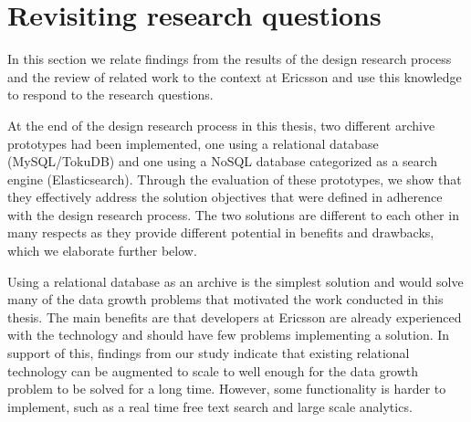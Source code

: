 



\section{Revisiting research questions}
In this section we relate findings from the results of the design research process and the review of related work to the context at Ericsson and use this knowledge to respond to the research questions.

At the end of the design research process in this thesis, two different archive prototypes had been implemented, one using a relational database (MySQL/TokuDB) and one using a NoSQL database categorized as a search engine (Elasticsearch). Through the evaluation of these prototypes, we show that they effectively address the solution objectives that were defined in adherence with the design research process. The two solutions are different to each other in many respects as they provide different potential in benefits and drawbacks, which we elaborate further below.

Using a relational database as an archive is the simplest solution and would solve many of the data growth problems that motivated the work conducted in this thesis. The main benefits are that developers at Ericsson are already experienced with the technology and should have few problems implementing a solution. In support of this, findings from our study indicate that existing relational technology can be augmented to scale to well enough for the data growth problem to be solved for a long time. However, some functionality is harder to implement, such as a real time free text search and large scale analytics.

